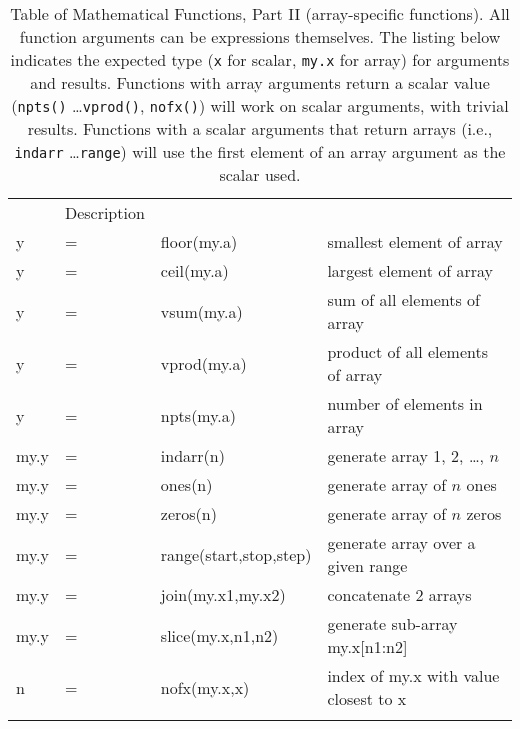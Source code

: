\begin{table}[t]
{}
  \begin{center}
  \caption[a]{Table of Mathematical Functions, Part II (array-specific functions). 
    All function arguments can be expressions themselves.  The listing
    below indicates the expected type ({\tt{x}} for scalar, {\tt{my.x}} for
    array) for arguments and results.  Functions with array arguments
    return a scalar value ({\tt{npts()}} \ldots {\tt{vprod()}},
    {\tt{nofx()}}) will work on scalar arguments, with trivial results.
    Functions with a scalar arguments that return arrays (i.e., {\tt{indarr}}
    \ldots {\tt{range}}) will use the first element of an array argument as
    the scalar used.  \smallskip } {\label{Table:Operators2}}
  \begin{tabular}{llll}
    \noalign{\smallskip}%
    \multicolumn{3}{l}{Function Prototype} & Description  \\ 
    \noalign{\smallskip} \hline   \noalign{\smallskip}
    y   &=&  floor(my.a)  & smallest element of array\\
    y   &=&  ceil(my.a)   & largest element of array\\
    y   &=&  vsum(my.a)   & sum of all elements of array\\
    y   &=&  vprod(my.a)  & product of all elements of array\\
    y   &=&  npts(my.a)   & number of  elements in array\\
    \noalign{\smallskip}
    my.y&=&  indarr(n)    & generate array 1, 2, \ldots, $n$\\
    my.y&=&  ones(n)      & generate array of $n$ ones\\
    my.y&=&  zeros(n)     & generate array of $n$ zeros\\
    my.y&=&  range(start,stop,step)    & generate array over a given range\\
    \noalign{\smallskip}
    my.y&=&  join(my.x1,my.x2) & concatenate 2 arrays\\
    my.y&=&  slice(my.x,n1,n2) & generate sub-array my.x[n1:n2] \\
    n   &=&  nofx(my.x,x)      & index of my.x with value closest to x\\
    \noalign{\smallskip}   \hline
 \end{tabular}
 \end{center}
\end{table} 


